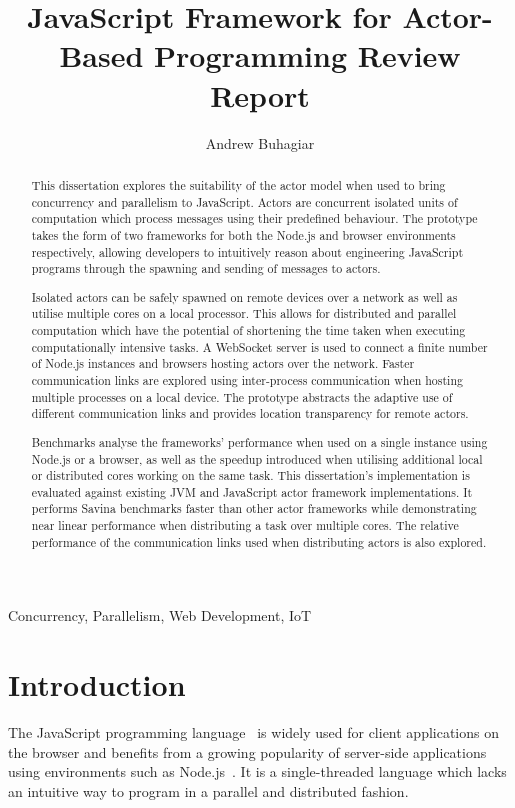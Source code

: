 \documentclass[lettersize,journal]{IEEEtran}
\begin{document}
\title{JavaScript Framework for Actor-Based Programming Review Report}
\author{Andrew Buhagiar}

\maketitle

\begin{abstract}
This dissertation explores the suitability of the actor model when used to bring concurrency and parallelism to JavaScript. Actors are concurrent isolated units of computation which process messages using their predefined behaviour. The prototype takes the form of two frameworks for both the Node.js and browser environments respectively, allowing developers to intuitively reason about engineering JavaScript programs through the spawning and sending of messages to actors.

Isolated actors can be safely spawned on remote devices over a network as well as utilise multiple cores on a local processor. This allows for distributed and parallel computation which have the potential of shortening the time taken when executing computationally intensive tasks. A WebSocket server is used to connect a finite number of Node.js instances and browsers hosting actors over the network. Faster communication links are explored using inter-process communication when hosting multiple processes on a local device. The prototype abstracts the adaptive use of different communication links and provides location transparency for remote actors.

Benchmarks analyse the frameworks' performance when used on a single instance using Node.js or a browser, as well as the speedup introduced when utilising additional local or distributed cores working on the same task. This dissertation's implementation is evaluated against existing JVM and JavaScript actor framework implementations. It performs Savina benchmarks faster than other actor frameworks while demonstrating near linear performance when distributing a task over multiple cores. The relative performance of the communication links used when distributing actors is also explored.
\end{abstract}

\begin{IEEEkeywords}
Concurrency, Parallelism, Web Development, IoT
\end{IEEEkeywords}

\section{Introduction}
The JavaScript programming language~\cite{ecmascript} is widely used for client applications on the browser and benefits from a growing popularity of server-side applications using environments such as Node.js~\cite{nodejs}. It is a single-threaded language which lacks an intuitive way to program in a parallel and distributed fashion. 
\end{document}
